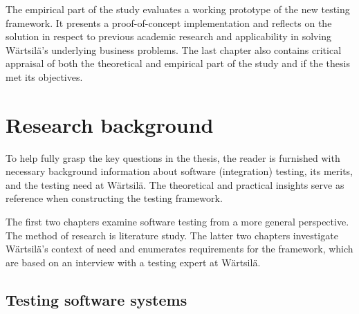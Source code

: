 \documentclass[12pt,a4paper,oneside,pdftex]{report}
\begin{document}
The empirical part of the study evaluates a working prototype of the new testing framework. It presents a proof-of-concept implementation and reflects on the solution in respect to previous academic research and applicability in solving Wärtsilä's underlying business problems. The last chapter also contains critical appraisal of both the theoretical and empirical part of the study and if the thesis met its objectives.
\begin{comment}
The storyline of the thesis is not unlike putting together Lego (hopefully as fun, too). In the background chapter the constructor can peruse the contextual setting and rough guidelines, not instructions \emph{per se}, to assembly, while in the next part, he/she is shown ready models, built by experts, for reference, example, and inspiration. After this, the box is merrily torn open and the bricks scattered on the floor. The builder can pore over individual pieces and see how they they appear, feel, and stick together. A prototype construct is made and compared to expectations and presented to interested parties.
\end{comment}

\chapter{Research background}
\label{chapter:background}


To help fully grasp the key questions in the thesis, the reader is furnished with necessary background information about software (integration) testing, its merits, and the testing need at Wärtsilä. The theoretical and practical insights serve as reference when constructing the testing framework. 

The first two chapters examine software testing from a more general perspective. The method of research is literature study. The latter two chapters investigate Wärtsilä's context of need and enumerates requirements for the framework, which are based on an interview with a testing expert at Wärtsilä.

\section{Testing software systems}
\end{document}
